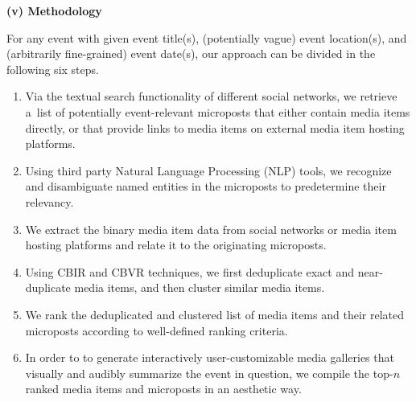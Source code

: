 \begin{abstracts}
\textbf{(v) Methodology}

For any event with given event title(s),
(potentially vague) event location(s), and
(arbitrarily fine-grained) event date(s), 
our approach can be divided in the following six steps.

\begin{enumerate}
  \item Via the textual search functionality of
        different social networks,
        we retrieve a~list of potentially event-relevant
        microposts that either contain media items directly,
        or that provide links to media items
        on external media item hosting platforms.
  \item Using third party
        Natural Language Processing (NLP) tools,
        we recognize and disambiguate named entities
        in the microposts to predetermine their relevancy.
  \item We extract the binary media item data
        from social networks or media item hosting platforms
        and relate it to the originating microposts.
  \item Using CBIR and CBVR techniques, we first deduplicate
        exact and near-duplicate media items,
        and then cluster similar media items.
  \item We rank the deduplicated and clustered list
        of media items and their related microposts
        according to well-defined ranking criteria.
  \item In order to to generate interactively user-customizable
        media galleries that visually and audibly summarize the
        event in question, we compile the top-$n$ ranked
        media items and microposts in an aesthetic way.
\end{enumerate}
\end{abstracts}
